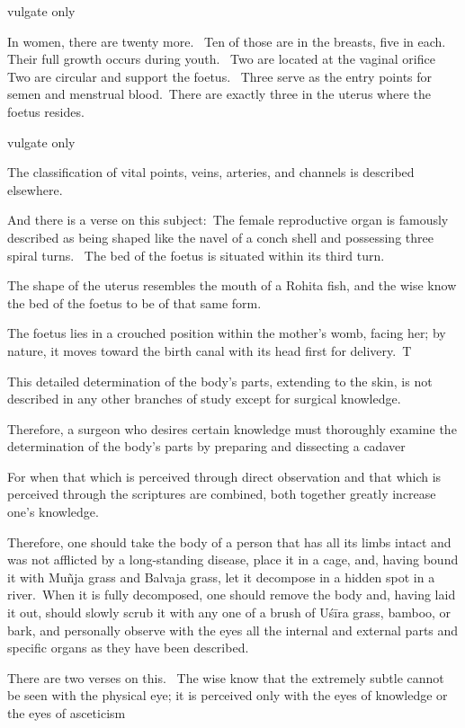 \begin{translation}
\begin{tt}
\item[38]  vulgate only

\item[39]
In women, there are twenty more.  Ten of those are in the breasts, five in each. 
Their full growth occurs during youth.  Two are located at the vaginal orifice
Two are circular and support the foetus.  Three serve as the entry points for semen and menstrual blood. There are exactly three in the uterus where the foetus resides. 

\item[40 \& 41]   vulgate only

\item[42]
The classification of vital points, veins, arteries, and channels is described elsewhere. 

\item[43]
And there is a verse on this subject: The female reproductive organ is famously described as being shaped like the navel of a conch shell and possessing three spiral turns. 
The bed of the foetus is situated within its third turn. 

\item[44]
The shape of the uterus resembles the mouth of a Rohita fish, and the wise know the bed of the foetus to be of that same form. 

\item[45]
The foetus lies in a crouched position within the mother's womb, facing her; by nature, it moves toward the birth canal with its head first for delivery. T

\item[46]
This detailed determination of the body's parts, extending to the skin, is not described in any other branches of study except for surgical knowledge.

\item[47]
Therefore, a surgeon who desires certain knowledge must thoroughly examine the determination of the body's parts by preparing and dissecting a cadaver

\item[48]
For when that which is perceived through direct observation and that which is perceived through the scriptures are combined, both together greatly increase one's knowledge. 

\item[49]
Therefore, one should take the body of a person that has all its limbs intact and was not afflicted by a long-standing disease, place it in a cage, and, having bound it with Muñja grass and Balvaja grass, let it decompose in a hidden spot in a river. When it is fully decomposed, one should remove the body and, having laid it out, should slowly scrub it with any one of a brush of Uśīra grass, bamboo, or bark, and personally observe with the eyes all the internal and external parts and specific organs as they have been described. 
\item[50]
There are two verses on this.  The wise know that the extremely subtle cannot be seen with the physical eye; it is perceived only with the eyes of knowledge or the eyes of asceticism



\end{tt}
\end{translation}
